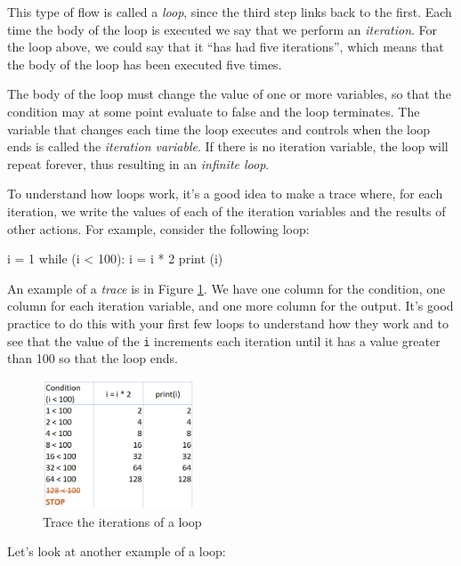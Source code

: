 This type of flow is called a \emph{loop}, since the third step links back to the first. Each time the body of the loop is executed we say that we perform an \emph{iteration}. For the loop above, we could say that it ``has had five iterations'', which means that the body of the loop has been executed five times.

  

The body of the loop must change the value of one or more variables, so that the condition may at some point evaluate to false and the loop terminates. The variable that changes each time the loop executes and controls when the loop ends is called the \emph{iteration variable}. If there is no iteration variable, the loop will repeat forever, thus resulting in an \emph{infinite loop}.

To understand how loops work, it's a good idea to make a trace where, for each iteration, we write the values of each of the iteration variables and the results of other actions. For example, consider the following loop:

\begin{python}[frame=single]
i = 1
while (i < 100):
    i = i * 2
    print (i)
\end{python}

An example of a \emph{trace} is in Figure \ref{fig:traza}. We have one column for the condition, one column for each iteration variable, and one more column for the output. It's good practice to do this with your first few loops to understand how they work and to see that the value of the \verb|i| increments each iteration until it has a value greater than 100 so that the loop ends.

\begin{figure}[H]
    \centering
    \includegraphics[width=0.4\textwidth]{images/traza-eng.png}
    \caption{Trace the iterations of a loop}
    \label{fig:traza}
\end{figure}


Let's look at another example of a loop:

